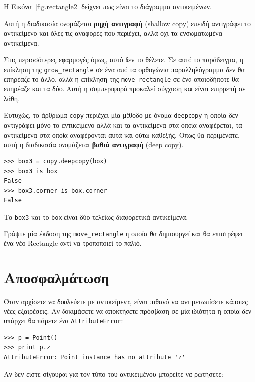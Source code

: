 \documentclass[10pt]{book}
\begin{document}
Η Εικόνα~\ref{fig.rectangle2} δείχνει πως είναι το διάγραμμα αντικειμένων.

Αυτή η διαδικασία ονομάζεται {\bf ρηχή αντιγραφή} (shallow copy) επειδή αντιγράφει το αντικείμενο και όλες
τις αναφορές που περιέχει, αλλά όχι τα ενσωματωμένα αντικείμενα.

Στις περισσότερες εφαρμογές όμως, αυτό δεν το θέλετε. Σε αυτό το παράδειγμα, η επίκληση της
\verb"grow_rectangle" σε ένα από τα ορθογώνια παραλληλόγραμμα δεν θα επηρέαζε το άλλο, αλλά η επίκληση
της \verb"move_rectangle" σε ένα οποιοδήποτε θα επηρέαζε και τα δύο. Αυτή η συμπεριφορά προκαλεί
σύγχυση και είναι επιρρεπή σε λάθη.

Ευτυχώς, το άρθρωμα {\tt copy} περιέχει μία μέθοδο με όνομα {\tt deepcopy} η οποία δεν αντιγράφει
μόνο το αντικείμενο αλλά και τα αντικείμενα στα οποία αναφέρεται, τα αντικείμενα στα οποία αναφέρονται
αυτά και ούτω καθεξής. Όπως θα περιμένατε, αυτή η διαδικασία ονομάζεται {\bf βαθιά αντιγραφή} (deep copy). 

\begin{verbatim}
>>> box3 = copy.deepcopy(box)
>>> box3 is box
False
>>> box3.corner is box.corner
False
\end{verbatim}
%
Το {\tt box3} και το {\tt box} είναι δύο τελείως διαφορετικά αντικείμενα.
\\

\begin{exercise}

Γράψτε μία έκδοση της \verb"move_rectangle" η οποία θα δημιουργεί και θα επιστρέφει ένα νέο Rectangle
αντί να τροποποιεί το παλιό.
\end{exercise}



\section{Αποσφαλμάτωση}
\label{hasattr}

Όταν αρχίσετε να δουλεύετε με αντικείμενα, είναι πιθανό να αντιμετωπίσετε κάποιες νέες εξαιρέσεις.
Αν δοκιμάσετε να αποκτήσετε πρόσβαση σε μία ιδιότητα η οποία δεν υπάρχει θα πάρετε
ένα {\tt AttributeError}:

\begin{verbatim}
>>> p = Point()
>>> print p.z
AttributeError: Point instance has no attribute 'z'
\end{verbatim}
%
Αν δεν είστε σίγουροι για τον τύπο του αντικειμένου μπορείτε να ρωτήσετε:
\end{document}
